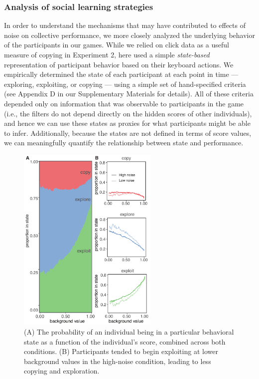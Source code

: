 \documentclass[12pt,letterpaper]{article}
\begin{document}
\subsubsection{Analysis of social learning strategies}

In order to understand the mechanisms that may have contributed to effects of noise on collective performance, we more closely analyzed the underlying behavior of the participants in our games.
While we relied on click data as a useful measure of copying in Experiment 2, here used a simple \emph{state-based} representation of participant behavior based on their keyboard actions.
We empirically determined the state of each participant at each point in time --- exploring, exploiting, or copying --- using a simple set of hand-specified criteria (see Appendix D in our Supplementary Materials for details).
All of these criteria depended only on information that was observable to participants in the game (i.e., the filters do not depend directly on the hidden scores of other individuals), and hence we can use these states as proxies for what participants might be able to infer.
Additionally, because the states are not defined in terms of score values, we can meaningfully quantify the relationship between state and performance.

\begin{figure}[t!]
  \centering
  \includegraphics[width=0.6\textwidth]{./figures/new_states}
  \caption{(A) The probability of an individual being in a particular behavioral state as a function of the individual's score, combined across both conditions. (B) Participants tended to begin exploiting at lower background values in the high-noise condition, leading to less copying and exploration.}
  \label{fig:states}
\end{figure}
\end{document}
